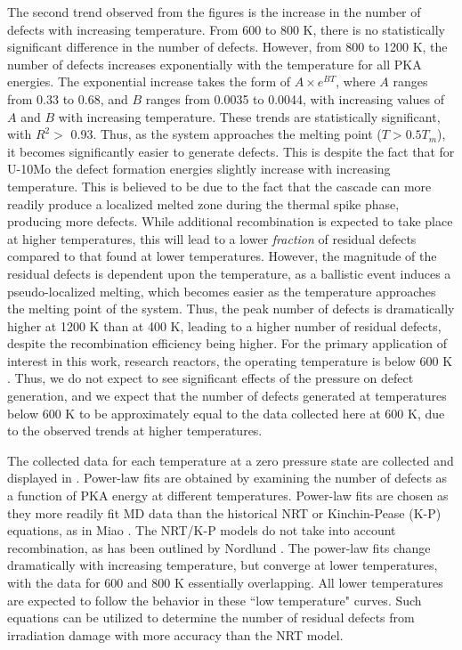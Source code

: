 \documentclass[review]{elsarticle}
\begin{document}
The second trend observed from the figures is the increase in the number of defects with increasing temperature. From 600 to 800 K, there is no statistically significant difference in the number of defects. However, from 800 to 1200 K, the number of defects increases exponentially with the temperature for all PKA energies. The exponential increase takes the form of $ A \times e^{BT}$, where $A$ ranges from 0.33 to 0.68, and $B$ ranges from 0.0035 to 0.0044, with increasing values of $A$ and $B$ with increasing temperature. These trends are statistically significant, with $R^2 >$ 0.93. Thus, as the system approaches the melting point ($T>0.5T_m$), it becomes significantly easier to generate defects. This is despite the fact that for U-10Mo the defect formation energies slightly increase with increasing temperature. This is believed to be due to the fact that the cascade can more readily produce a localized melted zone during the thermal spike phase, producing more defects. While additional recombination is expected to take place at higher temperatures, this will lead to a lower \textit{fraction} of residual defects compared to that found at lower temperatures. However, the magnitude of the residual defects is dependent upon the temperature, as a ballistic event induces a pseudo-localized melting, which becomes easier as the temperature approaches the melting point of the system. Thus, the peak number of defects is dramatically higher at 1200 K than at 400 K, leading to a higher number of residual defects, despite the recombination efficiency being higher. For the primary application of interest in this work, research reactors, the operating temperature is below 600 K \cite{umo_prelim_report2017}. Thus, we do not expect to see significant effects of the pressure on defect generation, and we expect that the number of defects generated at temperatures below 600 K to be approximately equal to the data collected here at 600 K, due to the observed trends at higher temperatures. 

The collected data for each temperature at a zero pressure state are collected and displayed in . Power-law fits are obtained by examining the number of defects as a function of PKA energy at different temperatures. Power-law fits are chosen as they more readily fit MD data than the historical NRT \cite{norgett1975} or Kinchin-Pease (K-P) \cite{kinchin1955} equations, as in Miao \cite{miao2015}. The NRT/K-P models do not take into account recombination, as has been outlined by Nordlund \cite{nordlund2018}. The power-law fits change dramatically with increasing temperature, but converge at lower temperatures, with the data for 600 and 800 K essentially overlapping. All lower temperatures are expected to follow the behavior in these ``low temperature" curves. Such equations can be utilized to determine the number of residual defects from irradiation damage with more accuracy than the NRT model. 
\end{document}
